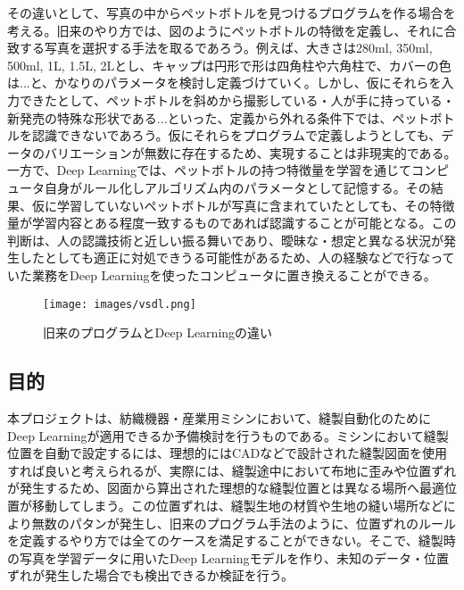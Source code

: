 その違いとして、写真の中からペットボトルを見つけるプログラムを作る場合を考える。旧来のやり方では、図のようにペットボトルの特徴を定義し、それに合致する写真を選択する手法を取るであろう。例えば、大きさは280ml, 350ml, 500ml, 1L, 1.5L, 2Lとし、キャップは円形で形は四角柱や六角柱で、カバーの色は...と、かなりのパラメータを検討し定義づけていく。しかし、仮にそれらを入力できたとして、ペットボトルを斜めから撮影している・人が手に持っている・新発売の特殊な形状である...といった、定義から外れる条件下では、ペットボトルを認識できないであろう。仮にそれらをプログラムで定義しようとしても、データのバリエーションが無数に存在するため、実現することは非現実的である。一方で、Deep Learningでは、ペットボトルの持つ特徴量を学習を通じてコンピュータ自身がルール化しアルゴリズム内のパラメータとして記憶する。その結果、仮に学習していないペットボトルが写真に含まれていたとしても、その特徴量が学習内容とある程度一致するものであれば認識することが可能となる。この判断は、人の認識技術と近しい振る舞いであり、曖昧な・想定と異なる状況が発生したとしても適正に対処できうる可能性があるため、人の経験などで行なっていた業務をDeep Learningを使ったコンピュータに置き換えることができる。
\\
\begin{figure}[htbp]
  \begin{center}
    \texttt{[image: images/vsdl.png]}
    \caption{旧来のプログラムとDeep Learningの違い}
    \label{fig:vsdl}
  \end{center}
\end{figure}


\subsection{目的}
本プロジェクトは、紡織機器・産業用ミシンにおいて、縫製自動化のためにDeep Learningが適用できるか予備検討を行うものである。ミシンにおいて縫製位置を自動で設定するには、理想的にはCADなどで設計された縫製図面を使用すれば良いと考えられるが、実際には、縫製途中において布地に歪みや位置ずれが発生するため、図面から算出された理想的な縫製位置とは異なる場所へ最適位置が移動してしまう。この位置ずれは、縫製生地の材質や生地の縫い場所などにより無数のパタンが発生し、旧来のプログラム手法のように、位置ずれのルールを定義するやり方では全てのケースを満足することができない。そこで、縫製時の写真を学習データに用いたDeep Learningモデルを作り、未知のデータ・位置ずれが発生した場合でも検出できるか検証を行う。

